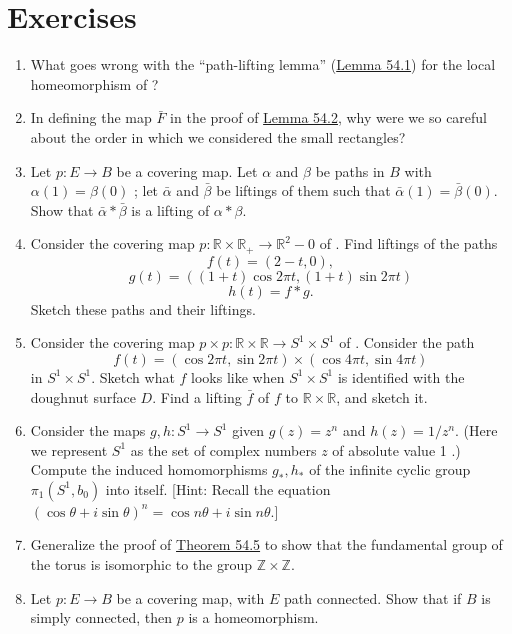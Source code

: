 \section*{Exercises}
\begin{enumerate}[itemsep=0.4em, parsep=0pt, topsep=0pt, partopsep=0pt, leftmargin=*, label=\arabic*., ref=\arabic*]
\item What goes wrong with the ``path-lifting lemma'' (\hyperref[lem:54.1]{Lemma 54.1}) for the local homeomorphism of ?
\item In defining the map \(\bar{F}\) in the proof of \hyperref[lem:54.2]{Lemma 54.2}, why were we so careful about the order in which we considered the small rectangles?
\item Let \(p : E \rightarrow B\) be a covering map. Let \(\alpha\) and \(\beta\) be paths in \(B\) with \(\alpha (1) = \beta ( 0)\) ; let \(\bar{\alpha }\) and \(\bar{\beta }\) be liftings of them such that \(\bar{\alpha }(1) = \bar{\beta }( 0)\). Show that \(\bar{\alpha } * \bar{\beta }\) is a lifting of \(\alpha * \beta\).
\item Consider the covering map \(p : \mathbb{R} \times {\mathbb{R}}_{ + } \rightarrow {\mathbb{R}}^{2} - 0\) of . Find liftings of the paths \[ f( t) = ( {2 - t,0}), \] \[ g( t) = ( {( {1 + t}) \cos {2\pi t},( {1 + t}) \sin {2\pi t}}) \] \[ h( t) = f * g. \] Sketch these paths and their liftings.
\item Consider the covering map \(p \times p : \mathbb{R} \times \mathbb{R} \rightarrow {S}^{1} \times {S}^{1}\) of . Consider the path \[ f( t) = ( {\cos {2\pi t},\sin {2\pi t}}) \times ( {\cos {4\pi t},\sin {4\pi t}}) \] in \(S^{1} \times {S}^{1}\). Sketch what \(f\) looks like when \(S^{1} \times {S}^{1}\) is identified with the doughnut surface \(D\). Find a lifting \(\bar{f}\) of \(f\) to \(\mathbb{R} \times \mathbb{R}\), and sketch it.
\item Consider the maps \(g,h : S^{1} \rightarrow {S}^{1}\) given \(g( z) = z^{n}\) and \(h( z) = 1/z^{n}\). (Here we represent \(S^{1}\) as the set of complex numbers \(z\) of absolute value 1 .) Compute the induced homomorphisms \(g_{ * },h_{ * }\) of the infinite cyclic group \({\pi }_{1}( {S^{1},b_{0}})\) into itself. [Hint: Recall the equation \({( \cos \theta + i\sin \theta ) }^{n} = \cos {n\theta } + i\sin {n\theta }\).]
\item Generalize the proof of \hyperref[thm:54.5]{Theorem 54.5} to show that the fundamental group of the torus is isomorphic to the group \(\mathbb{Z} \times \mathbb{Z}\).
\item Let \(p : E \rightarrow B\) be a covering map, with \(E\) path connected. Show that if \(B\) is simply connected, then \(p\) is a homeomorphism.
\end{enumerate}


